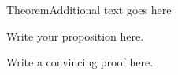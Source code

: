 \documentclass[\string~/GitHub/sthlmNordBeamerTheme/sthlmNordLightDemo.tex]{subfiles}
\begin{document}
\begin{frame}{Theorem}{Additional text goes here}

	Write your proposition here.

	\proof Write a convincing proof here.
\end{frame}
\end{document}
